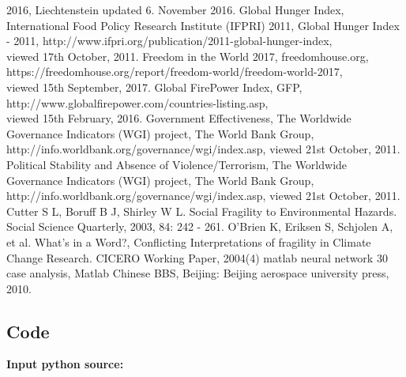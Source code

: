 \documentclass{mcmthesis}
\begin{document}
\begin{thebibliography}{99}
2016, Liechtenstein updated 6. November 2016.
 Global Hunger Index, International Food Policy Research Institute 
(IFPRI) 2011, Global Hunger Index - 2011,
http://www.ifpri.org/publication/2011-global-hunger-index, \\ 
viewed 17th October, 2011.
 Freedom in the World 2017, freedomhouse.org,\\ 
https://freedomhouse.org/report/freedom-world/freedom-world-2017, \\ 
viewed 15th September, 2017.
 Global FirePower Index, GFP,
http://www.globalfirepower.com/countries-listing.asp, \\ 
viewed 15th February, 2016.
 Government Effectiveness, The Worldwide Governance 
Indicators (WGI) project, The World Bank Group, 
http://info.worldbank.org/governance/wgi/index.asp, viewed 21st October, 2011.
 Political Stability and Absence of Violence/Terrorism, 
The Worldwide Governance Indicators (WGI) project, The World Bank Group, \\
http://info.worldbank.org/governance/wgi/index.asp, viewed 21st October, 2011.
 Cutter S L, Boruff B J, Shirley W L. Social 
Fragility to Environmental Hazards. Social Science 
Quarterly, 2003, 84: 242 - 261.
 O’Brien K, Eriksen S, Schjolen A, et al. What’s in a Word?, 
Conflicting Interpretations of fragility in Climate Change Research. CICERO Working Paper, 2004(4)
 matlab neural network 30 case analysis, Matlab Chinese BBS, Beijing: Beijing aerospace university press, 2010.
\end{thebibliography}

\begin{appendices}

\section{Code}

\textbf{\textcolor[rgb]{0.98,0.00,0.00}{Input python source:}}



\end{appendices}
\end{document}
